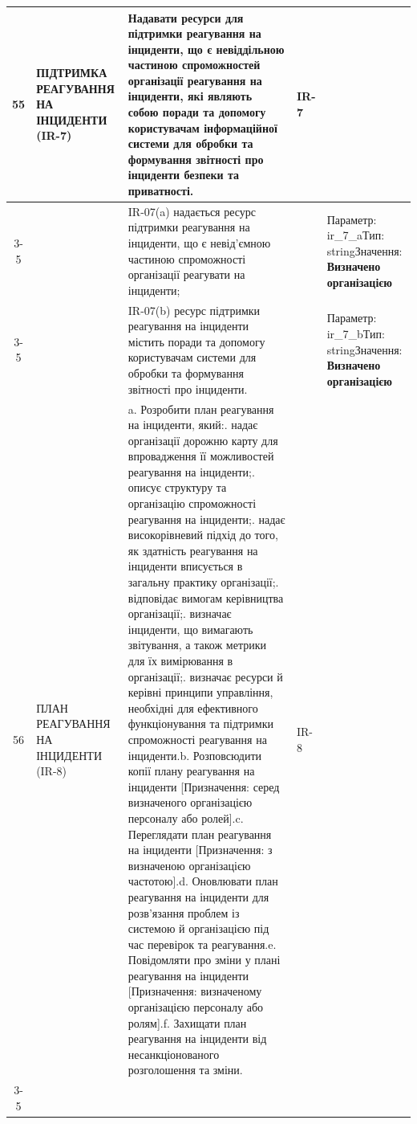 \documentclass[10pt]{article}
\begin{document}
\begin{longtable}{|c|>{\raggedright\arraybackslash}p{4cm}|>{\raggedright\arraybackslash}p{6cm}|>{\raggedright\arraybackslash}p{1.5cm}|>{\raggedright\arraybackslash}p{3.5cm}|}
55 & ПІДТРИМКА РЕАГУВАННЯ НА ІНЦИДЕНТИ (IR-7) & Надавати ресурси для підтримки реагування на інциденти, що є невіддільною частиною спроможностей організації реагування на інциденти, які являють собою поради та допомогу користувачам інформаційної системи для обробки та формування звітності про інциденти безпеки та приватності.\newline  & IR-7 & \\ \cline{3-5}
 &  & IR-07(a) надається ресурс підтримки реагування на інциденти, що є невід'ємною частиною спроможності організації реагувати на інциденти; &  & Параметр: ir\_\allowbreak{}7\_\allowbreak{}a\newline Тип: string\newline Значення: \textbf{Визначено організацією} \\ \cline{3-5}
 &  & IR-07(b) ресурс підтримки реагування на інциденти містить поради та допомогу користувачам системи для обробки та формування звітності про інциденти. &  & Параметр: ir\_\allowbreak{}7\_\allowbreak{}b\newline Тип: string\newline Значення: \textbf{Визначено організацією} \\ \hline
56 & ПЛАН РЕАГУВАННЯ НА ІНЦИДЕНТИ (IR-8) & a. Розробити план реагування на інциденти, який:\newline 1. надає організації дорожню карту для впровадження її можливостей реагування на інциденти;\newline 2. описує структуру та організацію спроможності реагування на інциденти;\newline 3. надає високорівневий підхід до того, як здатність реагування на інциденти вписується в загальну практику організації;\newline 4. відповідає вимогам керівництва організації;\newline 5. визначає інциденти, що вимагають звітування, а також метрики для їх вимірювання в організації;\newline 6. визначає ресурси й керівні принципи управління, необхідні для ефективного функціонування та підтримки спроможності реагування на інциденти.\newline b. Розповсюдити копії плану реагування на інциденти [Призначення: серед визначеного організацією персоналу або ролей].\newline c. Переглядати план реагування на інциденти [Призначення: з визначеною організацією частотою].\newline d. Оновлювати план реагування на інциденти для розв'язання проблем із системою й організацією під час перевірок та реагування.\newline e. Повідомляти про зміни у плані реагування на інциденти [Призначення: визначеному організацією персоналу або ролям].\newline f. Захищати план реагування на інциденти від несанкціонованого розголошення та зміни.\newline  & IR-8 & \\ \cline{3-5}

\end{longtable}
\end{document}
